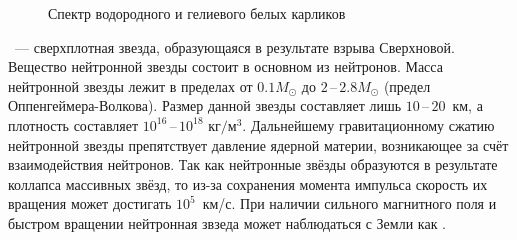 \begin{figure}[h!]
    \centering
    \caption{Спектр водородного и гелиевого белых карликов}
    \label{pic:spectrum-wd}
\end{figure}



~--- сверхплотная звезда, образующаяся в результате взрыва Сверхновой. Вещество нейтронной звезды состоит в основном из нейтронов. Масса нейтронной звезды лежит в пределах от $0.1M_{\odot}$ до $2$\,--\,$2.8M_{\odot}$ (предел Оппенгеймера-Волкова). Размер данной звезды составляет лишь $10$\,--\,$20$~км, а плотность составляет $10^{16}$\,--\,$10^{18}$ $\text{кг}/\text{м}^3$.  Дальнейшему гравитационному сжатию нейтронной звезды препятствует давление ядерной материи, возникающее за счёт взаимодействия нейтронов. Так как нейтронные звёзды образуются в результате  коллапса массивных звёзд, то из-за сохранения момента импульса скорость их вращения может достигать $10^5$~км/с. При наличии сильного магнитного поля и быстром вращении нейтронная звзеда может наблюдаться с Земли как .

